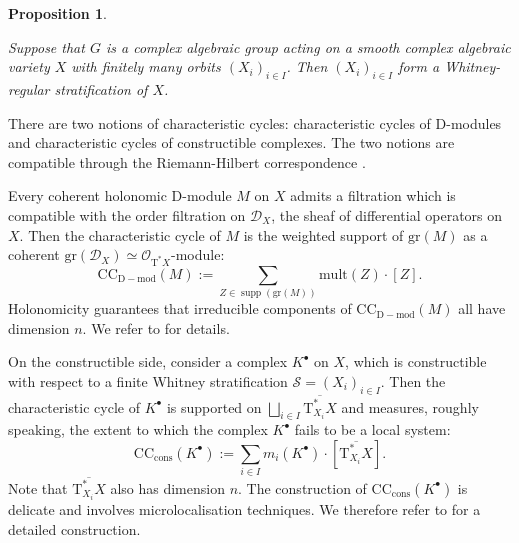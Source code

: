 \documentclass[11pt,english]{article}
\numberwithin{equation}{section}
\numberwithin{figure}{section}
\theoremstyle{definition}
\theoremstyle{plain}
\newtheorem{prop}[df]{Proposition}
\theoremstyle{remark}
\DeclareMathOperator{\supp}{supp}
\begin{document}
\begin{prop}{\cite[Prop. 1.14.]{Dim92}} \label{Prop/WhitneyStrat}

Suppose that $G$ is a complex algebraic group acting on a smooth
complex algebraic variety $X$ with finitely many orbits $(X_{i})_{i\in I}$.
Then $(X_{i})_{i\in I}$ form a Whitney-regular stratification of
$X$.

\end{prop}

There are two notions of characteristic cycles: characteristic cycles
of D-modules and characteristic cycles of constructible complexes.
The two notions are compatible through the Riemann-Hilbert correspondence
\cite[Prop. 5.3.2]{Dim04}.

Every coherent holonomic D-module $M$ on $X$ admits a filtration
which is compatible with the order filtration on $\mathcal{D}_{X}$,
the sheaf of differential operators on $X$. Then the characteristic
cycle of $M$ is the weighted support of $\mathrm{gr}(M)$ as a coherent
$\mathrm{gr}(\mathcal{D}_{X})\simeq\mathcal{O}_{\mathrm{T}^{*}X}$-module:\[
\mathrm{CC}_{\mathrm{D-mod}}(M):=\sum_{Z\in\supp(\mathrm{gr}(M))}\mathrm{mult}(Z)\cdot [Z].
\]Holonomicity guarantees that irreducible components of $\mathrm{CC}_{\mathrm{D-mod}}(M)$
all have dimension $n$. We refer to \cite[\S 2.2.]{HTT08} for details.

On the constructible side, consider a complex $K^{\bullet}$ on $X$,
which is constructible with respect to a finite Whitney stratification
$\mathcal{S}=(X_{i})_{i\in I}$. Then the characteristic cycle of
$K^{\bullet}$ is supported on $\bigsqcup_{i\in I}\overline{\mathrm{T}_{X_{i}}^{*}X}$
and measures, roughly speaking, the extent to which the complex $K^{\bullet}$
fails to be a local system:\[
\mathrm{CC}_{\mathrm{cons}}(K^{\bullet}):=\sum_{i\in I}m_i(K^{\bullet})\cdot [\overline{\mathrm{T}_{X_{i}}^{*}X}].
\] Note that $\overline{\mathrm{T}_{X_{i}}^{*}X}$ also has dimension
$n$. The construction of $\mathrm{CC}_{\mathrm{cons}}(K^{\bullet})$
is delicate and involves microlocalisation techniques. We therefore
refer to \cite[Ch. IX]{KS90} for a detailed construction. 
\end{document}
